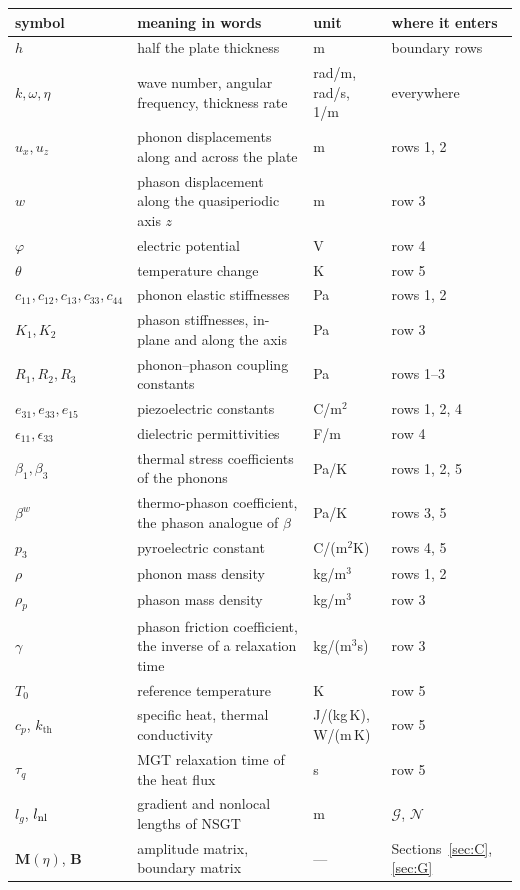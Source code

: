\documentclass[11pt,a4paper]{article}
\newcommand{\Nc}{\mathcal{N}}
\newcommand{\Gc}{\mathcal{G}}
\newcommand{\kB}{k_{\mathrm{th}}}
\newcommand{\bwth}{\beta^{w}}
\begin{document}
\begin{center}\footnotesize
\begin{tabular}{p{2.0cm}p{5.6cm}p{1.9cm}p{4.6cm}}
\toprule
symbol & meaning in words & unit & where it enters\\
\midrule
$h$ & half the plate thickness & m & boundary rows\\
$k,\omega,\eta$ & wave number, angular frequency, thickness rate & rad/m, rad/s, 1/m & everywhere\\
$u_x,u_z$ & phonon displacements along and across the plate & m & rows 1, 2\\
$w$ & phason displacement along the quasiperiodic axis $z$ & m & row 3\\
$\varphi$ & electric potential & V & row 4\\
$\theta$ & temperature change & K & row 5\\
$c_{11},c_{12},c_{13},c_{33},c_{44}$ & phonon elastic stiffnesses & Pa & rows 1, 2\\
$K_1,K_2$ & phason stiffnesses, in-plane and along the axis & Pa & row 3\\
$R_1,R_2,R_3$ & phonon--phason coupling constants & Pa & rows 1--3\\
$e_{31},e_{33},e_{15}$ & piezoelectric constants & C/m$^2$ & rows 1, 2, 4\\
$\epsilon_{11},\epsilon_{33}$ & dielectric permittivities & F/m & row 4\\
$\beta_1,\beta_3$ & thermal stress coefficients of the phonons & Pa/K & rows 1, 2, 5\\
$\bwth$ & thermo-phason coefficient, the phason analogue of $\beta$ & Pa/K & rows 3, 5\\
$p_3$ & pyroelectric constant & C/(m$^2$K) & rows 4, 5\\
$\rho$ & phonon mass density & kg/m$^3$ & rows 1, 2\\
$\rho_p$ & phason mass density & kg/m$^3$ & row 3\\
$\gamma$ & phason friction coefficient, the inverse of a relaxation time & kg/(m$^3$s) & row 3\\
$T_0$ & reference temperature & K & row 5\\
$c_p$, $\kB$ & specific heat, thermal conductivity & J/(kg\,K), W/(m\,K) & row 5\\
$\tau_q$ & MGT relaxation time of the heat flux & s & row 5\\
$l_g$, $l_{\rm nl}$ & gradient and nonlocal lengths of NSGT & m & $\Gc$, $\Nc$\\
$\mathbf M(\eta)$, $\mathbf B$ & amplitude matrix, boundary matrix & --- & Sections~\ref{sec:C}, \ref{sec:G}\\
\bottomrule
\end{tabular}
\end{center}
\end{document}
